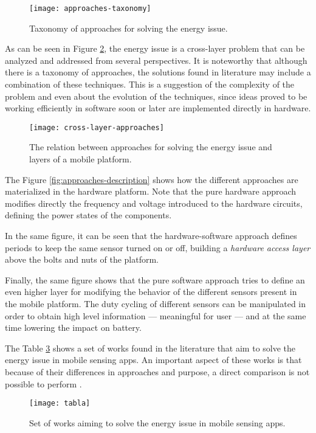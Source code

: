 \begin{figure}
\centering
\texttt{[image: approaches-taxonomy]}
\caption[Taxonomy of approaches for solving the energy issue]{Taxonomy of approaches for solving the energy issue.}
\label{fig:approaches-taxonomy}
\end{figure}

As can be seen in Figure \ref{fig:cross-layer-approaches}, the energy issue is a cross-layer problem that can be analyzed and addressed from several perspectives.
It is noteworthy that although there is a taxonomy of approaches, the solutions found in literature may include a combination of these techniques.
This is a suggestion of the complexity of the problem and even about the evolution of the techniques, since ideas proved to be working efficiently in software soon or later are implemented directly in hardware. 
\begin{figure}
\centering
\texttt{[image: cross-layer-approaches]}
\caption[Energy issue as an OS cross-platform problem]{The relation between approaches for solving the energy issue and layers of a mobile platform.}
\label{fig:cross-layer-approaches}
\end{figure}

The Figure \ref{fig:approaches-description} shows how the different approaches are materialized in the hardware platform. Note that the pure hardware approach modifies directly the frequency and voltage introduced to the hardware circuits, defining the power states of the components.

In the same figure, it can be seen that the hardware-software approach defines periods to keep the same sensor turned on or off, building a \emph{hardware access layer} above the bolts and nuts of the platform.

Finally, the same figure shows that the pure software approach tries to define an even higher layer for modifying the behavior of the different sensors present in the mobile platform. The duty cycling of different sensors can be manipulated in order to obtain high level information --- meaningful for user --- and at the same time lowering the impact on battery.

The Table \ref{fig:tabla} shows a set of works found in the literature that aim to solve the energy issue in mobile sensing apps.
An important aspect of these works is that because of their differences in approaches and purpose, a direct comparison is not possible to perform \cite{Vallina-Rodriguez2013}.
\begin{figure}
\centering
\texttt{[image: tabla]}
\caption[Works aiming to solve the energy issue in MSA]{Set of works aiming to solve the energy issue in mobile sensing apps.}
\label{fig:tabla}
\end{figure}


